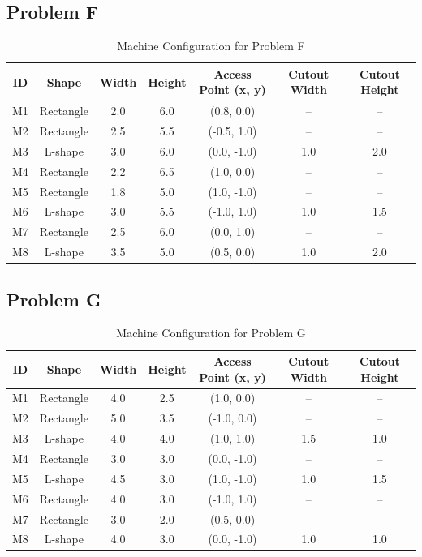 \subsection{Problem F}
\begin{table}[H]
\centering
\small
\begin{tabular}{ccccccc}
\toprule
\textbf{ID} & \textbf{Shape} & \textbf{Width} & \textbf{Height} & \textbf{Access Point (x, y)} & \textbf{Cutout Width} & \textbf{Cutout Height} \\
\midrule
M1 & Rectangle & 2.0 & 6.0 & (0.8, 0.0)   & --   & --   \\
M2 & Rectangle & 2.5 & 5.5 & (-0.5, 1.0)  & --   & --   \\
M3 & L-shape   & 3.0 & 6.0 & (0.0, -1.0)  & 1.0  & 2.0  \\
M4 & Rectangle & 2.2 & 6.5 & (1.0, 0.0)   & --   & --   \\
M5 & Rectangle & 1.8 & 5.0 & (1.0, -1.0)  & --   & --   \\
M6 & L-shape   & 3.0 & 5.5 & (-1.0, 1.0)  & 1.0  & 1.5  \\
M7 & Rectangle & 2.5 & 6.0 & (0.0, 1.0)   & --   & --   \\
M8 & L-shape   & 3.5 & 5.0 & (0.5, 0.0)   & 1.0  & 2.0  \\
\bottomrule
\end{tabular}
\caption{Machine Configuration for Problem F}
\label{tab:machine_config_f}
\end{table}

\subsection{Problem G}
\begin{table}[H]
\centering
\small
\begin{tabular}{ccccccc}
\toprule
\textbf{ID} & \textbf{Shape} & \textbf{Width} & \textbf{Height} & \textbf{Access Point (x, y)} & \textbf{Cutout Width} & \textbf{Cutout Height} \\
\midrule
M1 & Rectangle & 4.0 & 2.5 & (1.0, 0.0)   & --   & --   \\
M2 & Rectangle & 5.0 & 3.5 & (-1.0, 0.0)  & --   & --   \\
M3 & L-shape   & 4.0 & 4.0 & (1.0, 1.0)   & 1.5  & 1.0  \\
M4 & Rectangle & 3.0 & 3.0 & (0.0, -1.0)  & --   & --   \\
M5 & L-shape   & 4.5 & 3.0 & (1.0, -1.0)  & 1.0  & 1.5  \\
M6 & Rectangle & 4.0 & 3.0 & (-1.0, 1.0)  & --   & --   \\
M7 & Rectangle & 3.0 & 2.0 & (0.5, 0.0)   & --   & --   \\
M8 & L-shape   & 4.0 & 3.0 & (0.0, -1.0)  & 1.0  & 1.0  \\
\bottomrule
\end{tabular}
\caption{Machine Configuration for Problem G}
\label{tab:machine_config_g}
\end{table}

